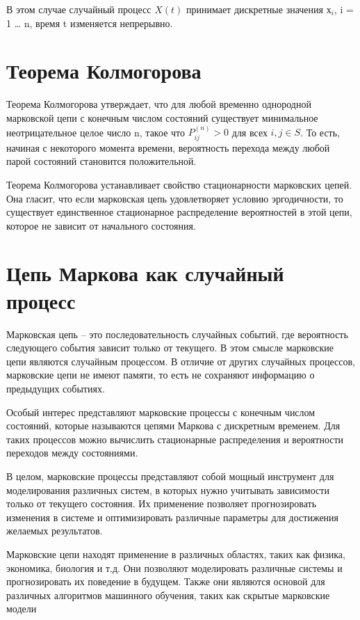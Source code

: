 \documentclass[12pt]{article}
\begin{document}
В этом случае случайный процесс $X(t)$ принимает дискретные значения $х_i$, i = 1 … n, время t изменяется непрерывно.

\section{Теорема Колмогорова}

Теорема Колмогорова утверждает, что для любой временно однородной марковской цепи с конечным числом состояний существует минимальное неотрицательное целое число n, такое что $P_{ij}^{(n)} > 0$ для всех $i,j \in S$. То есть, начиная с некоторого момента времени, вероятность перехода между любой парой состояний становится положительной.

Теорема Колмогорова устанавливает свойство стационарности марковских цепей. Она гласит, что если марковская цепь удовлетворяет условию эргодичности, то существует единственное стационарное распределение вероятностей в этой цепи, которое не зависит от начального состояния.

\section{Цепь Маркова как случайный процесс}

Марковская цепь – это последовательность случайных событий, где вероятность следующего события зависит только от текущего. В этом смысле марковские цепи являются случайным процессом. В отличие от других случайных процессов, марковские цепи не имеют памяти, то есть не сохраняют информацию о предыдущих событиях.

Особый интерес представляют марковские процессы с конечным числом состояний, которые называются цепями Маркова с дискретным временем. Для таких процессов можно вычислить стационарные распределения и вероятности переходов между состояниями.

В целом, марковские процессы представляют собой мощный инструмент для моделирования различных систем, в которых нужно учитывать зависимости только от текущего состояния. Их применение позволяет прогнозировать изменения в системе и оптимизировать различные параметры для достижения желаемых результатов.

Марковские цепи находят применение в различных областях, таких как физика, экономика, биология и т.д. Они позволяют моделировать различные системы и прогнозировать их поведение в будущем. Также они являются основой для различных алгоритмов машинного обучения, таких как скрытые марковские модели
\end{document}
